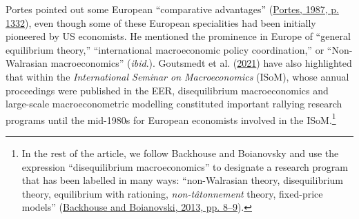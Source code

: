 \documentclass[
  12pt,
  onecolumn]{article}
\begin{document}
Portes pointed out some European ``comparative advantages''
(\protect\hyperlink{ref-portes1987}{Portes, 1987, p. 1332}), even though
some of these European specialities had been initially pioneered by US
economists. He mentioned the prominence in Europe of ``general
equilibrium theory,'' ``international macroeconomic policy
coordination,'' or ``Non-Walrasian macroeconomics'' (\emph{ibid}.).
Goutsmedt et al. (\protect\hyperlink{ref-goutsmedt2021}{2021}) have also
highlighted that within the \emph{International Seminar on
Macroeconomics} (ISoM), whose annual proceedings were published in the
EER, disequilibrium macroeconomics and large-scale macroeconometric
modelling constituted important rallying research programs until the
mid-1980s for European economists involved in the ISoM.\footnote{In the
  rest of the article, we follow Backhouse and Boianovsky and use the
  expression ``disequilibrium macroeconomics'' to designate a research
  program that has been labelled in many ways: ``non-Walrasian theory,
  disequilibrium theory, equilibrium with rationing,
  \emph{non-tâtonnement} theory, fixed-price models''
  (\protect\hyperlink{ref-backhouseboianovski2013}{Backhouse and
  Boianovski, 2013, pp. 8--9}).}
\end{document}
